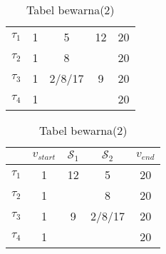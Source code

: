 {\begin{table}[H]
\begin{minipage}[c]{0.49\linewidth}
\begin{tabular}{ccccc}
			\midrule
			$\tau_{1}$ & 1 & 5 \cellcolor{green}& 12& 20\\
			$\tau_{2}$ & 1 & 8 \cellcolor{green}& & 20\\
			$\tau_{3}$ & 1 & 2/8/17 \cellcolor{green}& 9 & 20\\
			$\tau_{4}$ & 1 & \cellcolor{red}& & 20\\
			
			\bottomrule

		\end{tabular}
	\end{minipage}
	\begin{minipage}[c]{0.49\linewidth}
		
		\centering 
		\caption{Tabel bewarna(2)}
		\label{tab:cthwarna2}
		\begin{tabular}{ccccc}
			\toprule
			 & $v_{start}$ & $\mathcal{S}_{1}$ & $\mathcal{S}_{2}$ & $v_{end}$\\
			
			\midrule
			$\tau_{1}$ & 1 & 12& 5 \cellcolor{red} &20\\
			$\tau_{2}$ & 1 &  &  8 \cellcolor{green} &20\\
			$\tau_{3}$ & 1 & 9 & 2/8/17 \cellcolor{green} &20\\
			$\tau_{4}$ & 1 &   & \cellcolor{red} &20\\
			
			\bottomrule
		
		\end{tabular}
	\end{minipage}
\end{table}

 
}
